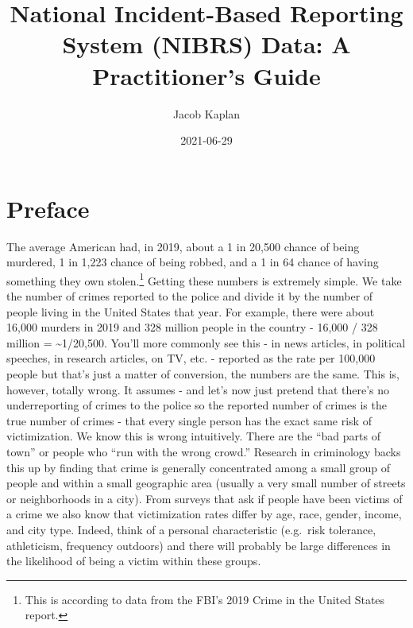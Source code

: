 \documentclass[
  12pt,
  openany]{book}
\title{National Incident-Based Reporting System (NIBRS) Data: A Practitioner's Guide}
\author{Jacob Kaplan}
\date{2021-06-29}
\begin{document}
\maketitle

{
\hypersetup{linkcolor=}
\setcounter{tocdepth}{4}
\tableofcontents
}
\listoftables
\listoffigures
{}
\hypertarget{preface}{%
\chapter{Preface}\label{preface}}

The average American had, in 2019, about a 1 in 20,500 chance of being murdered, 1 in 1,223 chance of being robbed, and a 1 in 64 chance of having something they own stolen.\footnote{This is according to data from the FBI's 2019 Crime in the United States report.} Getting these numbers is extremely simple. We take the number of crimes reported to the police and divide it by the number of people living in the United States that year. For example, there were about 16,000 murders in 2019 and 328 million people in the country - 16,000 / 328 million = \textasciitilde1/20,500. You'll more commonly see this - in news articles, in political speeches, in research articles, on TV, etc. - reported as the rate per 100,000 people but that's just a matter of conversion, the numbers are the same. This is, however, totally wrong. It assumes - and let's now just pretend that there's no underreporting of crimes to the police so the reported number of crimes is the true number of crimes - that every single person has the exact same risk of victimization. We know this is wrong intuitively. There are the ``bad parts of town'' or people who ``run with the wrong crowd.'' Research in criminology backs this up by finding that crime is generally concentrated among a small group of people and within a small geographic area (usually a very small number of streets or neighborhoods in a city). From surveys that ask if people have been victims of a crime we also know that victimization rates differ by age, race, gender, income, and city type. Indeed, think of a personal characteristic (e.g.~risk tolerance, athleticism, frequency outdoors) and there will probably be large differences in the likelihood of being a victim within these groups.
\end{document}
